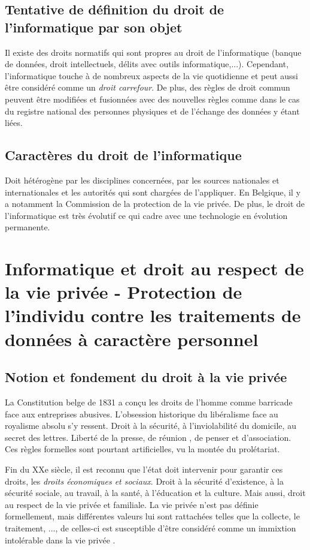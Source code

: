 \documentclass[fleqn,letterpaper, 12pt]{article}
\begin{document}
	\subsection{Tentative de définition du droit de l'informatique par son objet}
	
	Il existe des droits normatifs qui sont propres au droit de l'informatique (banque de données, droit intellectuels, délits avec outils informatique,...). Cependant, l'informatique touche à de nombreux aspects de la vie quotidienne et peut aussi être considéré comme un \emph{droit carrefour}. De plus, des règles de droit commun peuvent être modifiées et fusionnées avec des nouvelles règles comme dans le cas du registre national des personnes physiques et de l'échange des données y étant liées.
	
	\subsection{Caractères du droit de l'informatique}
	
	Doit hétérogène par les disciplines concernées, par les sources nationales et internationales et les autorités qui sont chargées de l'appliquer. En Belgique, il y a notamment la Commission de la protection de la vie privée. De plus, le droit de l'informatique est très évolutif ce qui cadre avec une technologie en évolution permanente.
	
	
	
	\section{Informatique et droit au respect de la vie privée - Protection de l'individu contre les traitements de données à caractère personnel}
	
	\subsection{Notion et fondement du droit à la vie privée}
	
	La Constitution belge de 1831 a conçu les droits de l'homme comme barricade face aux entreprises abusives. L'obsession historique du libéralisme face au royalisme absolu s'y ressent. Droit à la sécurité, à l'inviolabilité du domicile, au secret des lettres. Liberté de la presse, de réunion , de penser et d'association. Ces règles formelles sont pourtant artificielles, vu la montée du prolétariat.
	
	Fin du XXe siècle, il est reconnu que l'état doit intervenir pour garantir ces droits, les \emph{droits économiques et sociaux}. Droit à la sécurité d'existence, à la sécurité sociale, au travail, à la santé, à l'éducation et la culture. Mais aussi, droit au respect de la vie privée et familiale. La vie privée n'est pas définie formellement, mais différentes valeurs lui sont rattachées telles que la collecte, le traitement, ..., de celles-ci est susceptible d'être considéré comme un immixtion intolérable dans la vie privée .
\end{document}

